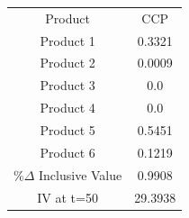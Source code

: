\begin{tabular}{cc}
Product & CCP \\
Product 1 & 0.3321 \\
Product 2 & 0.0009 \\
Product 3 & 0.0 \\
Product 4 & 0.0 \\
Product 5 & 0.5451 \\
Product 6 & 0.1219 \\
$\%\Delta$ Inclusive Value & 0.9908 \\
IV at t=50 & 29.3938 \\
\end{tabular}
